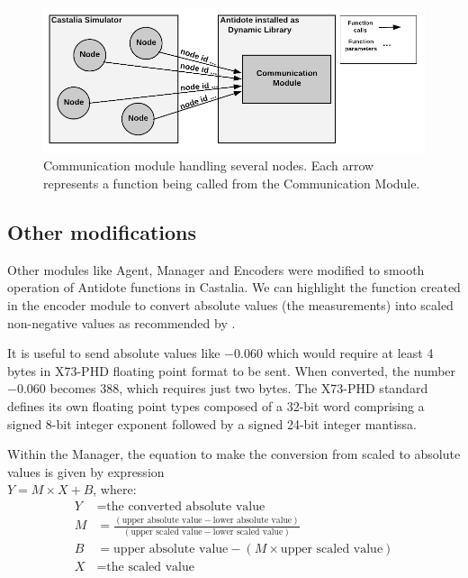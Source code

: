 \begin{figure}[htbp]
\centerline{\includegraphics[scale=0.31]{figures/communicationModule.png}}
\caption{Communication module handling several nodes. Each arrow represents a function being called from the Communication Module.}
\label{fig:communicationModuleCastalia}
\end{figure}

\subsection{Other modifications}

Other modules like Agent, Manager and Encoders were modified to smooth operation of Antidote functions in Castalia. We can highlight the function created in the encoder module to convert absolute values (the measurements) into scaled non-negative values as recommended by \cite{b1}.

It is useful to send absolute values like $-0.060$  which would require at least 4 bytes in X73-PHD floating point format to be sent. When converted, the number $-0.060$ becomes $388$, which requires just two bytes. The X73-PHD standard defines its own floating point types composed of a 32-bit word comprising a signed 8-bit integer exponent followed by a signed 24-bit integer mantissa.

Within the Manager, the equation to make the conversion from scaled to absolute values is given by expression\\$Y = M \times X + B$, where:
\begin{align*}
    Y &= \text{the converted absolute value}\\
    M &= \frac{(\text{upper absolute value} - \text{lower absolute value})}{(\text{upper scaled value} - \text{lower scaled value})}\\
    B &= \text{upper absolute value} - (M \times \text{upper scaled value})\\
    X &= \text{the scaled value}
\end{align*}

